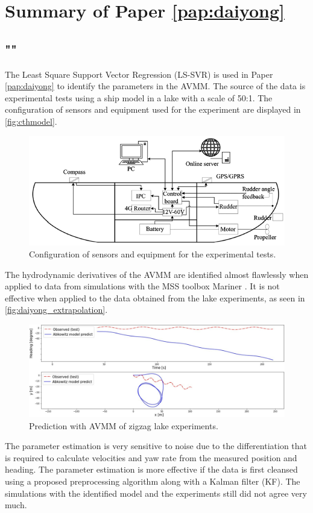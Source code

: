 \section{Summary of Paper \ref{pap:daiyong}}
\subsection*{""}
The Least Square Support Vector Regression (LS-SVR) \cite{brereton_support_2010} is used in Paper \ref{pap:daiyong} to identify the parameters in the AVMM.  
The source of the data is experimental tests using a ship model in a lake with a scale of 50:1. The configuration of sensors and equipment used for the experiment are displayed in \autoref{fig:cthmodel}.  
\begin{figure}[H]
    \centering
    \includegraphics[width=\textwidth]{kappa/images/cth_model.png}
    \caption{Configuration of sensors and equipment for the experimental tests.}
    \label{fig:cthmodel}
\end{figure}
\noindent The hydrodynamic derivatives of the AVMM are identified almost flawlessly when applied to data from simulations with the MSS toolbox Mariner \cite{tristan_matlab_2009}. It is not effective when applied to the data obtained from the lake experiments, as seen in \autoref{fig:daiyong_extrapolation}. 

\begin{figure}[H]
    \centering
    \includegraphics[width=\linewidth]{kappa/images/daiyong_extrapolation.jpeg}
    \caption{Prediction with AVMM of zigzag lake experiments.}
    \label{fig:daiyong_extrapolation}
\end{figure}

\noindent The parameter estimation is very sensitive to noise due to the differentiation that is required to calculate velocities and yaw rate from the measured position and heading. The parameter estimation is more effective if the data is first cleansed using a proposed preprocessing algorithm along with a Kalman filter (KF). The simulations with the identified model and the experiments still did not agree very much.